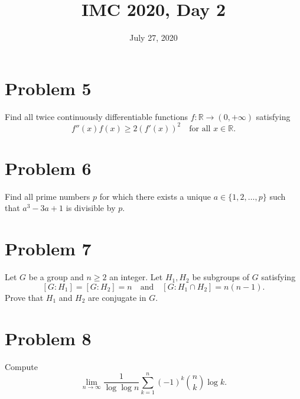 \documentclass{article}
\title{IMC 2020, Day 2}
\date{July 27, 2020}
\begin{document}
\maketitle

\section*{Problem 5}
Find all twice continuously differentiable functions $f : \mathbb{R} \to (0, +\infty)$ satisfying
\[ f''(x) f(x) \geq 2 (f'(x))^2 \quad \text{for all } x \in \mathbb{R}. \]

\section*{Problem 6}
Find all prime numbers $p$ for which there exists a unique $a \in \{1, 2, \ldots, p\}$ such that $a^3 - 3a + 1$ is divisible by $p$.

\section*{Problem 7}
Let $G$ be a group and $n \geq 2$ an integer. Let $H_1, H_2$ be subgroups of $G$ satisfying
\[ [G : H_1] = [G : H_2] = n \quad \text{and} \quad [G : H_1 \cap H_2] = n(n-1). \]
Prove that $H_1$ and $H_2$ are conjugate in $G$.

\section*{Problem 8}
Compute
\[ \lim_{n \to \infty} \frac{1}{\log \log n} \sum_{k=1}^n (-1)^k \binom{n}{k} \log k. \]
\end{document}
